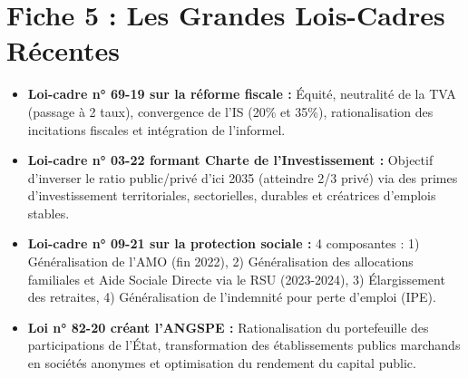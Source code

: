 \section{Fiche 5 : Les Grandes Lois-Cadres Récentes}

\begin{itemize}
    \item \textbf{Loi-cadre n° 69-19 sur la réforme fiscale :} Équité, neutralité de la TVA (passage à 2 taux), convergence de l'IS (20\% et 35\%), rationalisation des incitations fiscales et intégration de l'informel.
    \item \textbf{Loi-cadre n° 03-22 formant Charte de l'Investissement :} Objectif d'inverser le ratio public/privé d'ici 2035 (atteindre 2/3 privé) via des primes d'investissement territoriales, sectorielles, durables et créatrices d'emplois stables.
    \item \textbf{Loi-cadre n° 09-21 sur la protection sociale :} 4 composantes : 1) Généralisation de l'AMO (fin 2022), 2) Généralisation des allocations familiales et Aide Sociale Directe via le RSU (2023-2024), 3) Élargissement des retraites, 4) Généralisation de l'indemnité pour perte d'emploi (IPE).
    \item \textbf{Loi n° 82-20 créant l'ANGSPE :} Rationalisation du portefeuille des participations de l'État, transformation des établissements publics marchands en sociétés anonymes et optimisation du rendement du capital public.
\end{itemize}
